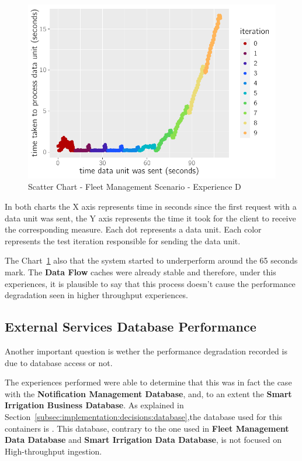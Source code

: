 \begin{figure}[H]
    \centering
    \includegraphics[page=1]{assets/charts/s1eD.pdf}
    \caption[Scatter Chart - Fleet Management Scenario - Experience D]{Scatter Chart - Fleet Management Scenario - Experience D}
    \label{fig:evaluation:overview:cache:chart:s1eD}
\end{figure}

In both charts the X axis represents time in seconds since the first request with a data unit was sent, the Y axis represents the time it took for the client to receive the corresponding measure. Each dot represents a data unit.
Each color represents the test iteration responsible for sending the data unit.

The Chart~\ref{fig:evaluation:overview:cache:chart:s1eD} also that the system started to underperform around the 65 seconds mark. The \textbf{Data Flow} caches were already stable and therefore, under this experiences, it is plausible to say that this process doesn't cause the performance degradation seen in higher throughput experiences.

\subsection{External Services Database Performance}
\label{subsec:evaluation:overview:servicedatabase}

Another important question is wether the performance degradation recorded is due to database access or not.

The experiences performed were able to determine that this was in fact the case with the \textbf{Notification Management Database}, and, to an extent the \textbf{Smart Irrigation Business Database}. As explained in Section~\ref{subsec:implementation:decisions:database},the database used for this containers is .
This database, contrary to the one used in \textbf{Fleet Management Data Database} and \textbf{Smart Irrigation Data Database}, is not focused on High-throughput ingestion.

